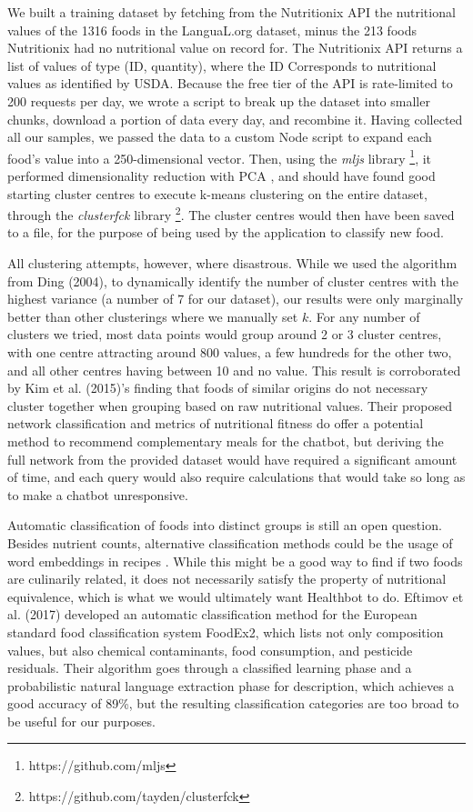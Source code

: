 We built a training dataset by fetching from the Nutritionix API the nutritional values of the 1316 foods in the LanguaL.org dataset, minus the 213 foods Nutritionix had no nutritional value on record for. The Nutritionix API returns a list of values of type (ID, quantity), where the ID Corresponds to nutritional values as identified by USDA. Because the free tier of the API is rate-limited to 200 requests per day, we wrote a script to break up the dataset into smaller chunks, download a portion of data every day, and recombine it. Having collected all our samples, we passed the data to a custom Node script to expand each food's value into a 250-dimensional vector. Then, using the \textit{mljs} library \footnote{https://github.com/mljs}, it performed dimensionality reduction with PCA \cite{Ding2004}, and should have found good starting cluster centres to execute k-means clustering on the entire dataset, through the \textit{clusterfck} library \footnote{https://github.com/tayden/clusterfck}. The cluster centres would then have been saved to a file, for the purpose of being used by the application to classify new food. 

All clustering attempts, however, where disastrous. While we used the algorithm from Ding (2004)\cite{Ding2004}, to dynamically identify the number of cluster centres with the highest variance (a number of 7 for our dataset), our results were only marginally better than other clusterings where we manually set $k$. For any number of clusters we tried, most data points would group around 2 or 3 cluster centres, with one centre attracting around 800 values, a few hundreds for the other two, and all other centres having between 10 and no value. This result is corroborated by Kim et al. (2015)\cite{Kim2015a}'s finding that foods of similar origins do not necessary cluster together when grouping based on raw nutritional values. Their proposed network classification and metrics of nutritional fitness do offer a potential method to recommend complementary meals for the chatbot, but deriving the full network from the provided dataset would have required a significant amount of time, and each query would also require calculations that would take so long as to make a chatbot unresponsive.

Automatic classification of foods into distinct groups is still an open question. Besides nutrient counts, alternative classification methods could be the usage of word embeddings in recipes \cite{food2vec}. While this might be a good way to find if two foods are culinarily related, it does not necessarily satisfy the property of nutritional equivalence, which is what we would ultimately want Healthbot to do.
Eftimov et al. (2017)\cite{Eftimov2017} developed an automatic classification method for the European standard food classification system FoodEx2, which lists not only composition values, but also chemical contaminants, food consumption, and pesticide residuals. Their algorithm goes through a classified learning phase and a probabilistic natural language extraction phase for description, which achieves a good accuracy of 89\%, but the resulting classification categories are too broad to be useful for our purposes.


